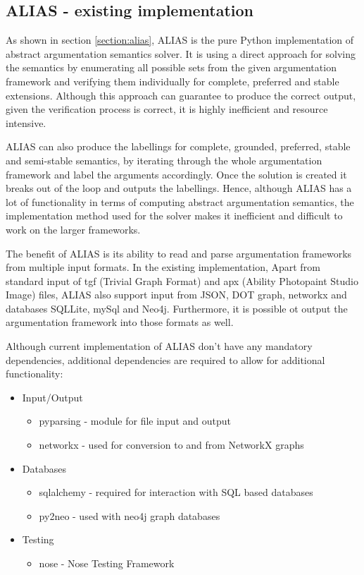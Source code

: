 \subsection{ALIAS - existing implementation}
As shown in section \ref{section:alias}, ALIAS \citep{alias} is the pure Python implementation of abstract argumentation semantics solver. It is using a direct approach for solving the semantics by enumerating all possible sets from the given argumentation framework and verifying them individually for complete, preferred and stable extensions. Although this approach can guarantee to produce the correct output, given the verification process is correct, it is highly inefficient and resource intensive. 

ALIAS can also produce the labellings for complete, grounded, preferred, stable and semi-stable semantics, by iterating through the whole argumentation framework and label the arguments accordingly. Once the solution is created it breaks out of the loop and outputs the labellings. Hence, although ALIAS has a lot of functionality in terms of computing abstract argumentation semantics, the implementation method used for the solver makes it inefficient and difficult to work on the larger frameworks. 

The benefit of ALIAS is its ability to read and parse argumentation frameworks from multiple input formats. In the existing implementation, Apart from standard input of tgf (Trivial Graph Format) and apx (Ability Photopaint Studio Image) files, ALIAS also support input from JSON, DOT graph, networkx and databases SQLLite, mySql and Neo4j. Furthermore, it is possible ot output the argumentation framework into those formats as well.

Although current implementation of ALIAS don't have any mandatory dependencies, additional dependencies are required to allow for additional functionality:
\begin{itemize}
	\item Input/Output
	\begin{itemize}
		\item pyparsing - module for file input and output
		\item networkx - used for conversion to and from NetworkX graphs 
	\end{itemize}
	\item Databases
	\begin{itemize}
		\item sqlalchemy - required for interaction with SQL based databases
		\item py2neo - used with neo4j graph databases
	\end{itemize}
	\item Testing
	\begin{itemize}
		\item nose - Nose Testing Framework
	\end{itemize}
\end{itemize}

